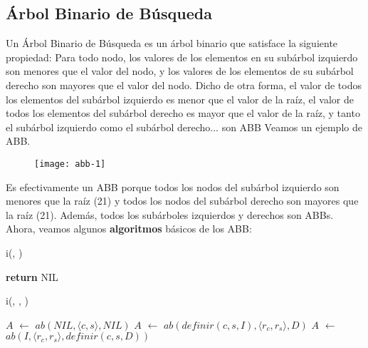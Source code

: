 \documentclass[10pt,a4paper]{article}
\begin{document}
\subsection{Árbol Binario de Búsqueda}

Un Árbol Binario de Búsqueda es un árbol binario que satisface la siguiente propiedad:
\newline
\newline
Para todo nodo, los valores de los elementos en su subárbol izquierdo son menores que el valor del nodo, y los valores de los elementos de su subárbol derecho son mayores que el valor del nodo.
\newline
\newline
Dicho de otra forma, el valor de todos los elementos del subárbol izquierdo es menor que el valor de la raíz, el valor de todos los elementos del subárbol derecho es mayor que el valor de la raíz, y tanto el subárbol izquierdo como el subárbol derecho... son ABB 
\newpage
Veamos un ejemplo de ABB.

\begin{figure}[h]
	\centering
	\texttt{[image: abb-1]}
	\label{drivers1}
\end{figure}
\medskip
\medskip
Es efectivamente un ABB porque todos los nodos del subárbol izquierdo son menores que la raíz (21) y todos los nodos del subárbol derecho son mayores que la raíz (21). Además, todos los subárboles izquierdos y derechos son ABBs.
\newline
{}
\medskip
\medskip
\medskip
Ahora, veamos algunos \textbf{algoritmos} básicos de los ABB:

\begin{algorithm}[H]{i(\In{}{$\secuvacia$}, )}
	\begin{algorithmic}[1]
		\State \textbf{return} NIL 
		
		\medskip
	\end{algorithmic}
\end{algorithm}

\begin{algorithm}[H]{i(, , )}
	\begin{algorithmic}[1]
		\State $A$ $\gets$ $ab(NIL, \langle c,s \rangle, NIL)$                      
		\Else
		\State $A$ $\gets$ $ab(definir(c,s,I), \langle r_{c},r_{s} \rangle, D)$
		\Else                    
		\State $A$ $\gets$ $ab(I, \langle r_{c},r_{s} \rangle, definir(c,s,D))$                     
		\EndIf
		\EndIf
		
		\medskip
	\end{algorithmic}
\end{algorithm}
\newpage
\end{document}
